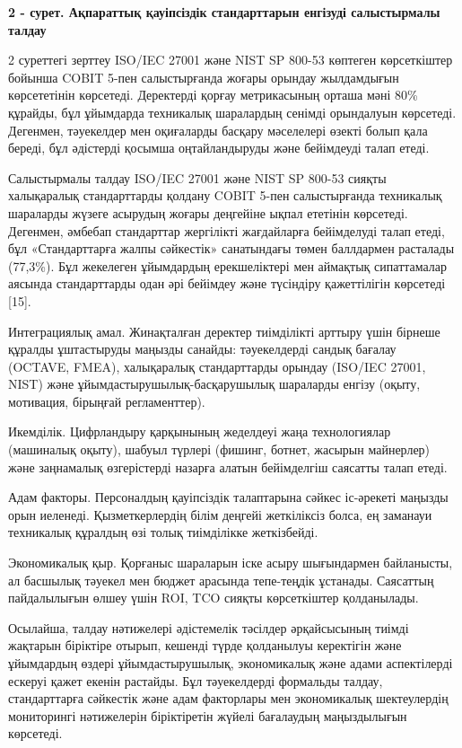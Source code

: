 {\bfseries 2 - сурет. Ақпараттық қауіпсіздік стандарттарын енгізуді
салыстырмалы талдау}

\begin{multicols}{2}
2 суреттегі зерттеу ISO/IEC 27001 және NIST SP 800-53 көптеген
көрсеткіштер бойынша COBIT 5-пен салыстырғанда жоғары орындау
жылдамдығын көрсететінін көрсетеді. Деректерді қорғау метрикасының
орташа мәні 80\% құрайды, бұл ұйымдарда техникалық шаралардың сенімді
орындалуын көрсетеді. Дегенмен, тәуекелдер мен оқиғаларды басқару
мәселелері өзекті болып қала береді, бұл әдістерді қосымша
оңтайландыруды және бейімдеуді талап етеді.

Салыстырмалы талдау ISO/IEC 27001 және NIST SP 800-53 сияқты халықаралық
стандарттарды қолдану COBIT 5-пен салыстырғанда техникалық шараларды
жүзеге асырудың жоғары деңгейіне ықпал ететінін көрсетеді. Дегенмен,
әмбебап стандарттар жергілікті жағдайларға бейімделуді талап етеді, бұл
«Стандарттарға жалпы сәйкестік» санатындағы төмен баллдармен расталады
(77,3\%). Бұл жекелеген ұйымдардың ерекшеліктері мен аймақтық
сипаттамалар аясында стандарттарды одан әрі бейімдеу және түсіндіру
қажеттілігін көрсетеді {[}15{]}.

Интеграциялық амал. Жинақталған деректер тиімділікті арттыру үшін
бірнеше құралды ұштастыруды маңызды санайды: тәуекелдерді сандық бағалау
(OCTAVE, FMEA), халықаралық стандарттарды орындау (ISO/IEC 27001, NIST)
және ұйымдастырушылық-басқарушылық шараларды енгізу (оқыту, мотивация,
бірыңғай регламенттер).

Икемділік. Цифрландыру қарқынының жеделдеуі жаңа технологиялар
(машиналық оқыту), шабуыл түрлері (фишинг, ботнет, жасырын майнерлер)
және заңнамалық өзгерістерді назарға алатын бейімделгіш саясатты талап
етеді.

Адам факторы. Персоналдың қауіпсіздік талаптарына сәйкес іс-әрекеті
маңызды орын иеленеді. Қызметкерлердің білім деңгейі жеткіліксіз болса,
ең заманауи техникалық құралдың өзі толық тиімділікке жеткізбейді.

Экономикалық қыр. Қорғаныс шараларын іске асыру шығындармен байланысты,
ал басшылық тәуекел мен бюджет арасында тепе-теңдік ұстанады. Саясаттың
пайдалылығын өлшеу үшін ROI, TCO сияқты көрсеткіштер қолданылады.

Осылайша, талдау нәтижелері әдістемелік тәсілдер әрқайсысының тиімді
жақтарын біріктіре отырып, кешенді түрде қолданылуы керектігін және
ұйымдардың өздері ұйымдастырушылық, экономикалық және адами аспектілерді
ескеруі қажет екенін растайды. Бұл тәуекелдерді формальды талдау,
стандарттарға сәйкестік және адам факторлары мен экономикалық
шектеулердің мониторингі нәтижелерін біріктіретін жүйелі бағалаудың
маңыздылығын көрсетеді.


\end{multicols}
